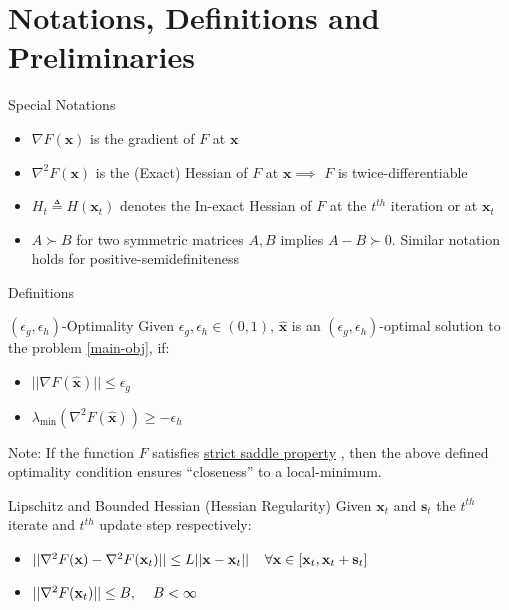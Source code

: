 \documentclass[10pt]{beamer}
\newcommand{\h}{\nabla^{2}}
\newcommand{\g}{\nabla}
\newcommand{\xbold}{\mathbf{x}}
\newcommand{\sbold}{\mathbf{s}}
\newcommand{\mineig}{\lambda_{\min}}
\newcommand{\eg}{\epsilon_{g}}
\newcommand{\eh}{\epsilon_{h}}
\begin{document}
\section{Notations, Definitions and Preliminaries}
\begin{frame}{Special Notations}
\begin{itemize}
\item<1->{\(\g F(\xbold)\) is the gradient of \(F\) at \(\xbold\)}
\item<2->{\(\h F(\xbold)\) is the (Exact) Hessian of \(F\) at \(\xbold \implies\) \(F\) is twice-differentiable}
\item<3->{\(H_{t} \triangleq H(\xbold_{t})\) denotes the In-exact Hessian of \(F\) at the \(t^{th}\) iteration or at \(\xbold_{t}\)}
\item<4->{\(A \succ B\) for two symmetric matrices \(A, B\) implies \(A - B \succ 0\). Similar notation holds for positive-semidefiniteness}
\end{itemize}
\end{frame}

\begin{frame}{Definitions}
\begin{alertblock}{\((\eg, \eh)\)-Optimality}
\label{sec-opt}
Given \(\eg, \eh \in (0, 1)\), \(\mathbf{\hat{x}}\) is an \((\eg, \eh)\)-optimal solution to the problem \ref{main-obj}, if:
\begin{itemize}
\item \(||\g F(\mathbf{\hat{x}}) || \leq \eg\)
\item \(\mineig (\h F(\mathbf{\hat{x}})) \geq -\eh\)
\end{itemize}
\end{alertblock}
\pause
Note: If the function \(F\) satisfies \underline{strict saddle property} , then the above defined optimality condition ensures ``closeness'' to a local-minimum.
\pause
\begin{alertblock}{Lipschitz and Bounded Hessian (Hessian Regularity)}
Given \(\xbold_{t}\) and \(\sbold_{t}\) the \(t^{th}\) iterate and \(t^{th}\) update step respectively:
\begin{itemize}
\item \(||\h F(\xbold) - \h F(\xbold_{t})|| \leq L||\xbold - \xbold_{t}|| \hspace{4mm} \forall \xbold \in [\xbold_{t}, \xbold_{t} + \sbold_{t}]\)
\item \(||\h F(\xbold_{t}) || \leq B, \hspace{4mm} B < \infty\)
\end{itemize}
\end{alertblock}
\end{frame}
\end{document}

